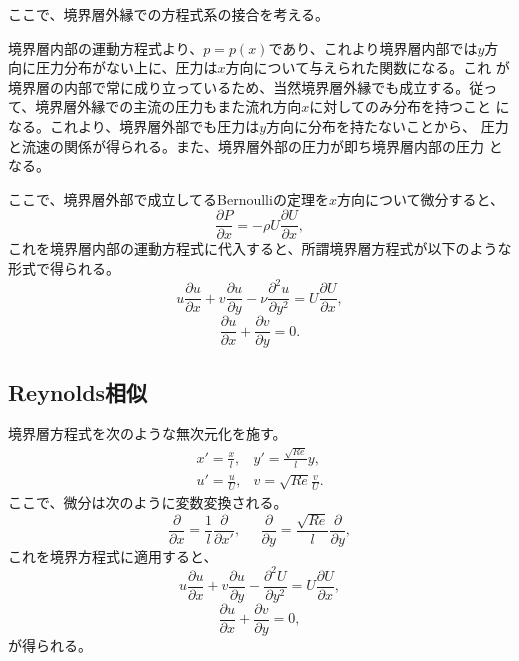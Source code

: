 ここで、境界層外縁での方程式系の接合を考える。

境界層内部の運動方程式より、$p=p(x)$であり、これより境界層内部では$y$方
向に圧力分布がない上に、圧力は$x$方向について与えられた関数になる。これ
が境界層の内部で常に成り立っているため、当然境界層外縁でも成立する。従っ
て、境界層外縁での主流の圧力もまた流れ方向$x$に対してのみ分布を持つこと
になる。これより、境界層外部でも圧力は$y$方向に分布を持たないことから、
圧力と流速の関係が得られる。また、境界層外部の圧力が即ち境界層内部の圧力
となる。

ここで、境界層外部で成立してるBernoulliの定理を$x$方向について微分すると、
\begin{equation}
 \frac{\partial P}{\partial x} = -\rho U \frac{\partial U}{\partial x},
\end{equation}
これを境界層内部の運動方程式に代入すると、所謂境界層方程式が以下のような
形式で得られる。
\begin{equation}
 u\frac{\partial u}{\partial x} 
 +v\frac{\partial u}{\partial y} 
 -\nu\frac{\partial^2u}{\partial y^2}
 = U\frac{\partial U}{\partial x},
\end{equation}
\begin{equation}
 \frac{\partial u}{\partial x}
  +\frac{\partial v}{\partial y}
  = 0.
\end{equation}

\subsection{Reynolds相似}
境界層方程式を次のような無次元化を施す。
\begin{align}
 x'=\frac{x}{l}, & y' = \frac{\sqrt{Re}}{l}y, \\
 u' = \frac{u}{U}, & v = \sqrt{Re}\frac{v}{U}.
\end{align}
ここで、微分は次のように変数変換される。
\begin{equation}
 \frac{\partial}{\partial x} = \frac{1}{l}\frac{\partial}{\partial x'},
  \mspace{25mu}
  \frac{\partial}{\partial y} = \frac{\sqrt{Re}}{l}\frac{\partial}{\partial y},
\end{equation}
これを境界方程式に適用すると、
\begin{equation}
 u\frac{\partial u}{\partial x}
  + v\frac{\partial u}{\partial y}
  - \frac{\partial^2U}{\partial y^2}
  = U\frac{\partial U}{\partial x},
\end{equation}
\begin{equation}
 \frac{\partial u}{\partial x} 
  +\frac{\partial v}{\partial y} = 0,
\end{equation}
が得られる。

